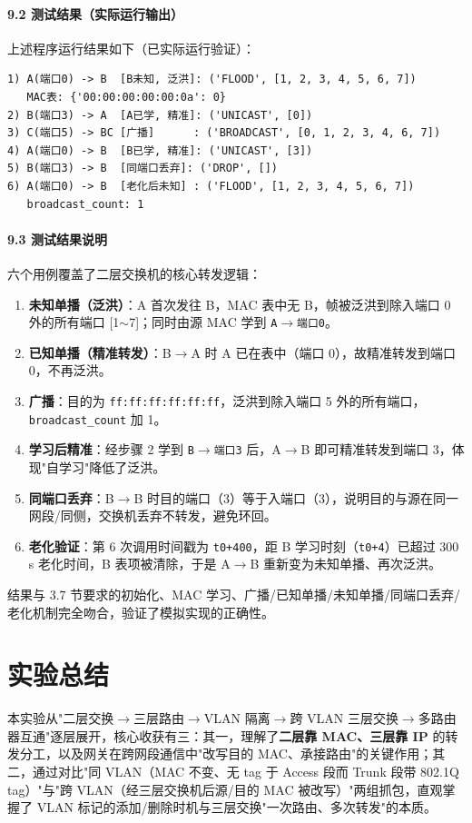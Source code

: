 \documentclass[12pt,a4paper]{article}
\begin{document}
\paragraph{9.2 测试结果（实际运行输出）}
上述程序运行结果如下（已实际运行验证）：
\begin{lstlisting}[style=cli]
1) A(端口0) -> B  [B未知, 泛洪]: ('FLOOD', [1, 2, 3, 4, 5, 6, 7])
   MAC表: {'00:00:00:00:00:0a': 0}
2) B(端口3) -> A  [A已学, 精准]: ('UNICAST', [0])
3) C(端口5) -> BC [广播]      : ('BROADCAST', [0, 1, 2, 3, 4, 6, 7])
4) A(端口0) -> B  [B已学, 精准]: ('UNICAST', [3])
5) B(端口3) -> B  [同端口丢弃]: ('DROP', [])
6) A(端口0) -> B  [老化后未知] : ('FLOOD', [1, 2, 3, 4, 5, 6, 7])
   broadcast_count: 1
\end{lstlisting}

\paragraph{9.3 测试结果说明}
六个用例覆盖了二层交换机的核心转发逻辑：
\begin{enumerate}
  \item \textbf{未知单播（泛洪）}：A 首次发往 B，MAC 表中无 B，帧被泛洪到除入端口 0 外的所有端口 [1$\sim$7]；同时由源 MAC 学到 \texttt{A$\to$端口0}。
  \item \textbf{已知单播（精准转发）}：B$\to$A 时 A 已在表中（端口 0），故精准转发到端口 0，不再泛洪。
  \item \textbf{广播}：目的为 \texttt{ff:ff:ff:ff:ff:ff}，泛洪到除入端口 5 外的所有端口，\texttt{broadcast\_count} 加 1。
  \item \textbf{学习后精准}：经步骤 2 学到 \texttt{B$\to$端口3} 后，A$\to$B 即可精准转发到端口 3，体现"自学习"降低了泛洪。
  \item \textbf{同端口丢弃}：B$\to$B 时目的端口（3）等于入端口（3），说明目的与源在同一网段/同侧，交换机丢弃不转发，避免环回。
  \item \textbf{老化验证}：第 6 次调用时间戳为 \texttt{t0+400}，距 B 学习时刻（\texttt{t0+4}）已超过 300 s 老化时间，B 表项被清除，于是 A$\to$B 重新变为未知单播、再次泛洪。
\end{enumerate}
结果与 3.7 节要求的初始化、MAC 学习、广播/已知单播/未知单播/同端口丢弃/老化机制完全吻合，验证了模拟实现的正确性。

\section{实验总结}
本实验从"二层交换$\to$三层路由$\to$VLAN 隔离$\to$跨 VLAN 三层交换$\to$多路由器互通"逐层展开，核心收获有三：其一，理解了\textbf{二层靠 MAC、三层靠 IP} 的转发分工，以及网关在跨网段通信中"改写目的 MAC、承接路由"的关键作用；其二，通过对比"同 VLAN（MAC 不变、无 tag 于 Access 段而 Trunk 段带 802.1Q tag）"与"跨 VLAN（经三层交换机后源/目的 MAC 被改写）"两组抓包，直观掌握了 VLAN 标记的添加/删除时机与三层交换"一次路由、多次转发"的本质。
\end{document}
